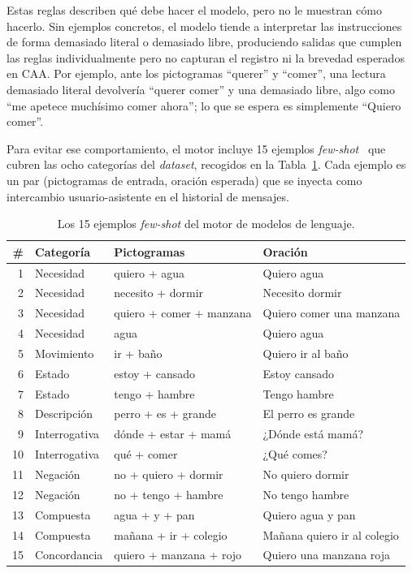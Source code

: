 Estas reglas describen qué debe hacer el modelo, pero no le muestran cómo hacerlo. Sin ejemplos concretos, el modelo tiende a interpretar las instrucciones de forma demasiado literal o demasiado libre, produciendo salidas que cumplen las reglas individualmente pero no capturan el registro ni la brevedad esperados en CAA. Por ejemplo, ante los pictogramas ``querer'' y ``comer'', una lectura demasiado literal devolvería ``querer comer'' y una demasiado libre, algo como ``me apetece muchísimo comer ahora''; lo que se espera es simplemente ``Quiero comer''.

Para evitar ese comportamiento, el motor incluye 15 ejemplos \textit{few-shot}~\cite{brown2020language} que cubren las ocho categorías del \textit{dataset}, recogidos en la Tabla~\ref{tab:f3-fewshot}. Cada ejemplo es un par (pictogramas de entrada, oración esperada) que se inyecta como intercambio usuario-asistente en el historial de mensajes.

\begin{table}[H]
\centering
\begin{tabular}{r l l l}
\hline
\# & Categoría & Pictogramas & Oración \\
\hline
1 & Necesidad & quiero + agua & Quiero agua \\
2 & Necesidad & necesito + dormir & Necesito dormir \\
3 & Necesidad & quiero + comer + manzana & Quiero comer una manzana \\
4 & Necesidad & agua & Quiero agua \\
5 & Movimiento & ir + baño & Quiero ir al baño \\
6 & Estado & estoy + cansado & Estoy cansado \\
7 & Estado & tengo + hambre & Tengo hambre \\
8 & Descripción & perro + es + grande & El perro es grande \\
9 & Interrogativa & dónde + estar + mamá & ¿Dónde está mamá? \\
10 & Interrogativa & qué + comer & ¿Qué comes? \\
11 & Negación & no + quiero + dormir & No quiero dormir \\
12 & Negación & no + tengo + hambre & No tengo hambre \\
13 & Compuesta & agua + y + pan & Quiero agua y pan \\
14 & Compuesta & mañana + ir + colegio & Mañana quiero ir al colegio \\
15 & Concordancia & quiero + manzana + rojo & Quiero una manzana roja \\
\hline
\end{tabular}
\caption{Los 15 ejemplos \textit{few-shot} del motor de modelos de lenguaje.}
\label{tab:f3-fewshot}
\end{table}

